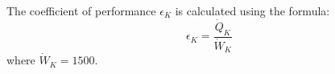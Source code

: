 The coefficient of performance \( \epsilon_K \) is calculated using the formula:  
\[
\epsilon_K = \frac{\dot{Q}_K}{\dot{W}_K}
\]  
where \( \dot{W}_K = 1500 \).